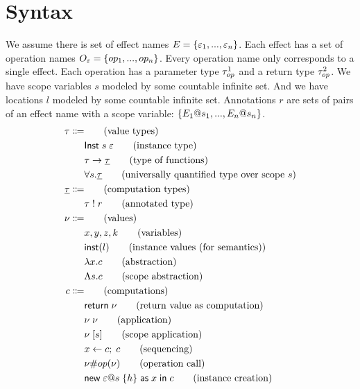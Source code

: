 {\section{Syntax}
We assume there is set of effect names $E = \{ \varepsilon_1, ..., \varepsilon_n \}$.
Each effect has a set of operation names $O_\varepsilon = \{ op_1, ..., op_n \}$.
Every operation name only corresponds to a single effect.
Each operation has a parameter type $\tau^1_{op}$ and a return type $\tau^2_{op}$.
We have scope variables $s$ modeled by some countable infinite set.
And we have locations $l$ modeled by some countable infinite set.
Annotations $r$ are sets of pairs of an effect name with a scope variable: $\{ E_1@s_1, ..., E_n@s_n \}$.
\\
\begin{align*}
	\ty \Coloneqq 	& 																	\tag{value types} \\
									& \tinst{s}{\eff}										\tag{instance type} \\
									& \tarr{\ty}{\cty}									\tag{type of functions} \\
									& \tforall{s}{\cty}									\tag{universally quantified type over scope $s$}\\
	\cty \Coloneqq 	& 																	\tag{computation types} \\
									& \aty{\ty}{r}											\tag{annotated type} \\
	\val \Coloneqq	&																		\tag{values} \\
									& x, y, z, k												\tag{variables} \\
									& \vinst{\loc}											\tag{instance values (for semantics)} \\
									& \vabs{x}{\comp}										\tag{abstraction} \\
									& \vabst{s}{\comp}									\tag{scope abstraction} \\
	\comp \Coloneqq	&																		\tag{computations} \\
									& \creturn{\val}										\tag{return value as computation} \\
									& \capp{\val}{\val}									\tag{application} \\
									& \cappt{\val}{s}										\tag{scope application} \\
									& \cdo{x}{\comp}{\comp}							\tag{sequencing} \\
									& \cop{\val}{\op}{\val}							\tag{operation call} \\
									& \cnew{\eff}{s}{\handler}{x}{\comp}		\tag{instance creation} \\

\end{align*}}
